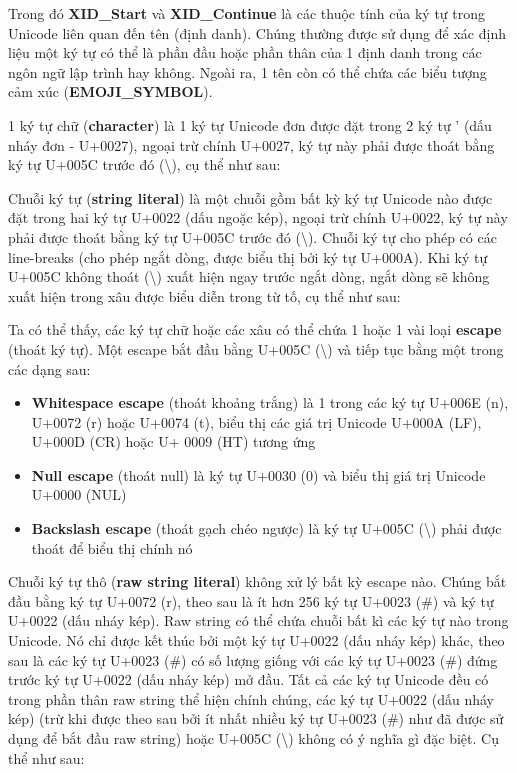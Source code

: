     \regexidentifier

\noindent Trong đó \textbf{XID\_Start} và \textbf{XID\_Continue} là các thuộc tính của ký tự trong Unicode liên quan đến tên (định danh). Chúng thường được sử dụng để xác định liệu một ký tự có thể là phần đầu hoặc phần thân của 1 định danh trong các ngôn ngữ lập trình hay không. Ngoài ra, 1 tên còn có thể chứa các biểu tượng cảm xúc (\textbf{EMOJI\_SYMBOL}).

    1 ký tự chữ (\textbf{character}) là 1 ký tự Unicode đơn được đặt trong 2 ký tự ' (dấu nháy đơn - U+0027), ngoại trừ chính U+0027, ký tự này phải được thoát bằng ký tự U+005C trước đó (\textbackslash), cụ thể như sau:

    \regexcharliteral

    Chuỗi ký tự (\textbf{string literal}) là một chuỗi gồm bất kỳ ký tự Unicode nào được đặt trong hai ký tự U+0022 (dấu ngoặc kép), ngoại trừ chính U+0022, ký tự này phải được thoát bằng ký tự U+005C trước đó (\textbackslash). Chuỗi ký tự cho phép có các line-breaks (cho phép ngắt dòng, được biểu thị bởi ký tự U+000A). Khi ký tự U+005C không thoát (\textbackslash) xuất hiện ngay trước ngắt dòng, ngắt dòng sẽ không xuất hiện trong xâu được biểu diễn trong từ tố, cụ thể như sau:

    \regexstringliteral

    Ta có thể thấy, các ký tự chữ hoặc các xâu có thể chứa 1 hoặc 1 vài loại \textbf{escape} (thoát ký tự). Một escape bắt đầu bằng U+005C (\textbackslash) và tiếp tục bằng một trong các dạng sau:

    \begin{itemize}
    \item{\textbf{Whitespace escape} (thoát khoảng trắng) là 1 trong các ký tự U+006E (n), U+0072 (r) hoặc U+0074 (t), biểu thị các giá trị Unicode U+000A (LF), U+000D (CR) hoặc U+ 0009 (HT) tương ứng}
    \item{\textbf{Null escape} (thoát null) là ký tự U+0030 (0) và biểu thị giá trị Unicode U+0000 (NUL)}
    \item{\textbf{Backslash escape} (thoát gạch chéo ngược) là ký tự U+005C (\textbackslash) phải được thoát để biểu thị chính nó}
    \end{itemize}

    Chuỗi ký tự thô (\textbf{raw string literal}) không xử lý bất kỳ escape nào. Chúng bắt đầu bằng ký tự U+0072 (r), theo sau là ít hơn 256 ký tự U+0023 (\#) và ký tự U+0022 (dấu nháy kép). Raw string có thể chứa chuỗi bất kì các ký tự nào trong Unicode. Nó chỉ được kết thúc bởi một ký tự U+0022 (dấu nháy kép) khác, theo sau là các ký tự U+0023 (\#) có số lượng giống với các ký tự U+0023 (\#) đứng trước ký tự U+0022 (dấu nháy kép) mở đầu. Tất cả các ký tự Unicode đều có trong phần thân raw string thể hiện chính chúng, các ký tự U+0022 (dấu nháy kép) (trừ khi được theo sau bởi ít nhất nhiều ký tự U+0023 (\#) như đã được sử dụng để bắt đầu raw string) hoặc U+005C (\textbackslash) không có ý nghĩa gì đặc biệt. Cụ thể như sau:

